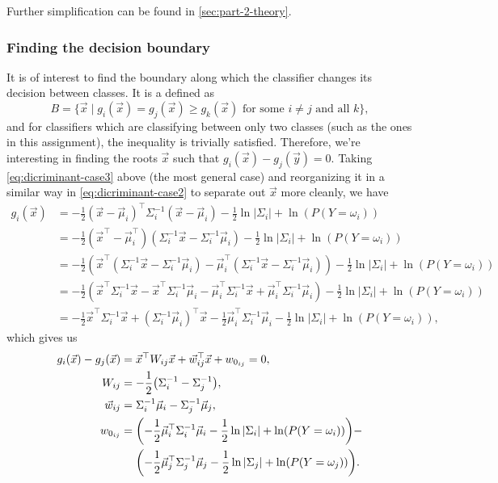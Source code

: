 \documentclass[headings=optiontoheadandtoc,listof=totoc,parskip=full]{scrartcl}
\begin{document}
Further simplification can be found in \cref{sec:part-2-theory}.

\subsubsection{Finding the decision boundary}

It is of interest to find the boundary along which the classifier changes its decision between classes. It is a defined as
\begin{equation}
	B = \{\vec x \mid g_i(\vec x) = g_j(\vec x) \geq g_k(\vec x) \text{ for some $i \neq j$ and all $k$}\},
\end{equation}
and for classifiers which are classifying between only two classes (such as the ones in this assignment), the inequality is trivially satisfied. Therefore, we're interesting in finding the roots $\vec x$ such that $g_i(\vec x) - g_j(\vec y) = 0$. Taking \cref{eq:dicriminant-case3} above (the most general case) and reorganizing it in a similar way in \cref{eq:dicriminant-case2} to separate out $\vec x$ more cleanly, we have
\begin{align*}
	g_i(\vec x) &= -\frac{1}{2}(\vec x - \vec\mu_i)^\top \Sigma_i^{-1} (\vec x - \vec\mu_i) -\frac{1}{2}\ln|\Sigma_i| + \ln(P(Y = \omega_i))\\
		&= -\frac{1}{2}(\vec x^\top - \vec\mu_i^\top) (\Sigma_i^{-1}\vec x - \Sigma_i^{-1}\vec\mu_i) -\frac{1}{2}\ln|\Sigma_i| + \ln(P(Y = \omega_i))\\
		&= -\frac{1}{2}(\vec x^\top(\Sigma_i^{-1}\vec x - \Sigma_i^{-1}\vec\mu_i) - \vec\mu_i^\top(\Sigma_i^{-1}\vec x - \Sigma_i^{-1}\vec\mu_i)) -\frac{1}{2}\ln|\Sigma_i| + \ln(P(Y = \omega_i))\\
		&= -\frac{1}{2}(\vec x^\top\Sigma_i^{-1}\vec x - \vec x^\top\Sigma_i^{-1}\vec\mu_i - \vec\mu_i^\top\Sigma_i^{-1}\vec x + \vec\mu_i^\top\Sigma_i^{-1}\vec\mu_i) -\frac{1}{2}\ln|\Sigma_i| + \ln(P(Y = \omega_i))\\
		&= -\frac{1}{2}\vec x^\top\Sigma_i^{-1}\vec x + (\Sigma_i^{-1}\vec\mu_i)^\top\vec x - \frac{1}{2}\vec\mu_i^\top\Sigma_i^{-1}\vec\mu_i - \frac{1}{2}\ln|\Sigma_i| + \ln(P(Y = \omega_i)),
\end{align*}
which gives us
\begin{align}
	g_i(\vec x) - g_j(\vec x) &= \vec x^\top W_{ij}\vec x + \vec w_{ij}^\top\vec x + w_{0_{ij}} = 0, \label{eq:discriminant-difference}\\
	W_{ij} &= -\frac{1}{2}\qty(\Sigma_i^{-1} - \Sigma_j^{-1}),\\
	\vec w_{ij} &= \Sigma_i^{-1}\vec\mu_i - \Sigma_j^{-1}\vec\mu_j,\\
	w_{0_{ij}} &= \qty(-\frac{1}{2}\vec\mu_i^\top\Sigma_i^{-1}\vec\mu_i - \frac{1}{2}\ln|\Sigma_i| + \ln(P(Y = \omega_i))) - \nonumber\\
	           &\mathrel{\phantom{=}} \qty(-\frac{1}{2}\vec\mu_j^\top\Sigma_j^{-1}\vec\mu_j - \frac{1}{2}\ln|\Sigma_j| + \ln(P(Y = \omega_j))).
\end{align}
\end{document}
